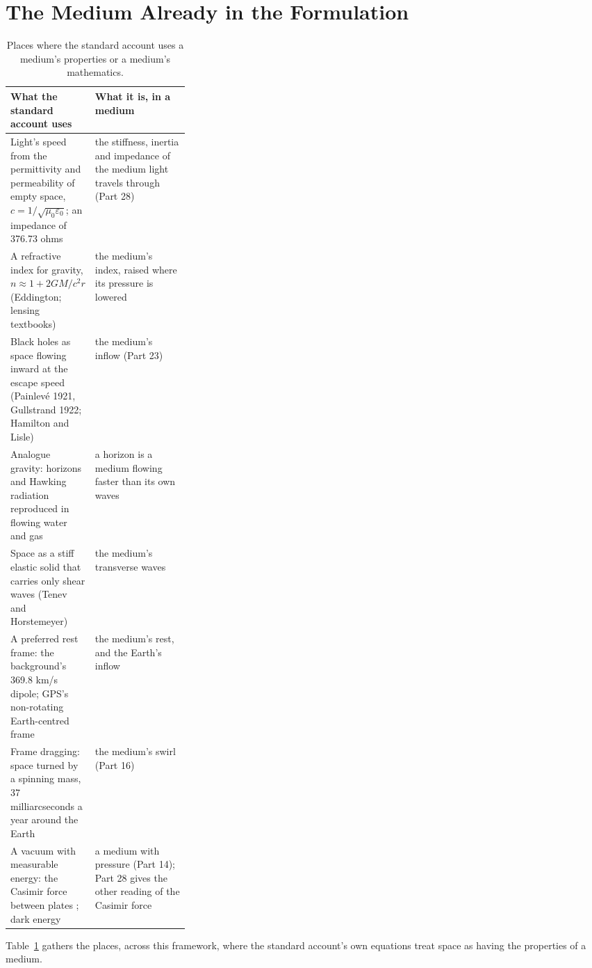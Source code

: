 \documentclass[11pt,a4paper]{article}
\begin{document}
\section{The Medium Already in the Formulation}

\begin{table}[t]\centering\small
\caption{Places where the standard account uses a medium's properties or a medium's mathematics.}
\begin{tabularx}{\linewidth}{@{}>{\raggedright}p{0.3\linewidth} X@{}}\toprule
\textbf{What the standard account uses} & \textbf{What it is, in a medium}\\\midrule
Light's speed from the permittivity and permeability of empty space, $c = 1/\sqrt{\mu_0\varepsilon_0}$; an impedance of 376.73 ohms & the stiffness, inertia and impedance of the medium light travels through (Part 28)\\
A refractive index for gravity, $n \approx 1 + 2GM/c^2r$ (Eddington; lensing textbooks) & the medium's index, raised where its pressure is lowered\\
Black holes as space flowing inward at the escape speed (Painlev\'e 1921, Gullstrand 1922; Hamilton and Lisle) & the medium's inflow (Part 23)\\
Analogue gravity: horizons and Hawking radiation reproduced in flowing water and gas \citep{barcelo2011} & a horizon is a medium flowing faster than its own waves\\
Space as a stiff elastic solid that carries only shear waves (Tenev and Horstemeyer) & the medium's transverse waves\\
A preferred rest frame: the background's 369.8 km/s dipole; GPS's non-rotating Earth-centred frame & the medium's rest, and the Earth's inflow\\
Frame dragging: space turned by a spinning mass, 37 milliarcseconds a year around the Earth \citep{everitt2011} & the medium's swirl (Part 16)\\
A vacuum with measurable energy: the Casimir force between plates \citep{lamoreaux1997}; dark energy & a medium with pressure (Part 14); Part 28 gives the other reading of the Casimir force\\\bottomrule
\end{tabularx}\label{tab:inform}\end{table}

Table~\ref{tab:inform} gathers the places, across this framework, where the standard account's own equations treat space as having the properties of a medium.
\end{document}
